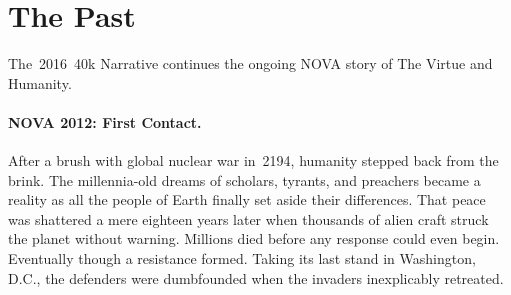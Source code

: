 \section{The Past}

The~2016~40k Narrative continues the ongoing NOVA story of The Virtue
and Humanity.

\paragraph{NOVA 2012: First Contact.}  After a brush with global
nuclear war in~2194, humanity stepped back from the brink.  The
millennia-old dreams of scholars, tyrants, and preachers became a
reality as all the people of Earth finally set aside their
differences.  That peace was shattered a mere eighteen years later
when thousands of alien craft struck the planet without warning.
Millions died before any response could even begin.  Eventually though
a resistance formed.  Taking its last stand in Washington, D.C., the
defenders were dumbfounded when the invaders inexplicably retreated.


